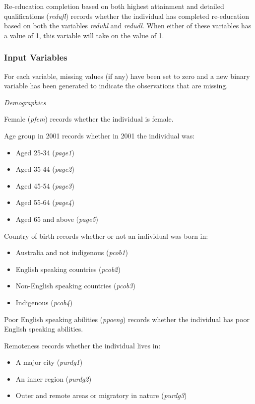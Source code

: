 \documentclass[12pt, a4paper]{article}
\begin{document}
Re-education completion based on both highest attainment and detailed qualifications (\textit{redufl}) records whether the individual has completed re-education based on both the variables \textit{reduhl} and \textit{redudl}. When either of these variables has a value of 1, this variable will take on the value of 1. 

\subsubsection{Input Variables}
For each variable, missing values (if any) have been set to zero and a new binary variable has been generated to indicate the observations that are missing. 

\emph{Demographics}

Female (\textit{p\textunderscore{}fem}) records whether the individual is female. 

Age group in 2001 records whether in 2001 the individual was:
\begin{itemize}
  \item Aged 25-34 (\textit{p\textunderscore{}age1})
  \item Aged 35-44 (\textit{p\textunderscore{}age2})
  \item Aged 45-54 (\textit{p\textunderscore{}age3})
  \item Aged 55-64 (\textit{p\textunderscore{}age4})
  \item Aged 65 and above (\textit{p\textunderscore{}age5})
 \end{itemize} 

Country of birth records whether or not an individual was born in:
\begin{itemize}
  \item Australia and not indigenous (\textit{p\textunderscore{}cob1}) 
  \item English speaking countries (\textit{p\textunderscore{}cob2})
  \item Non-English speaking countries (\textit{p\textunderscore{}cob3})
  \item Indigenous (\textit{p\textunderscore{}cob4})
\end{itemize}  
  
Poor English speaking abilities (\textit{p\textunderscore{}poeng}) records whether the individual has poor English speaking abilities. 

Remoteness records whether the individual lives in:
\begin{itemize}
  \item A major city (\textit{p\textunderscore{}urdg1})
  \item An inner region (\textit{p\textunderscore{}urdg2}) 
  \item Outer and remote areas or migratory in nature (\textit{p\textunderscore{}urdg3})
\end{itemize}  
  
\end{document}
